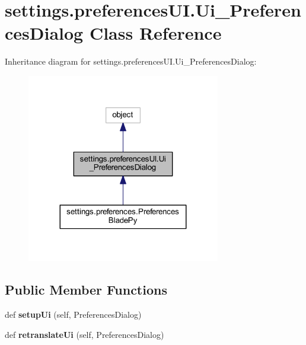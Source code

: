 \hypertarget{a00107}{}\section{settings.\+preferences\+U\+I.\+Ui\+\_\+\+Preferences\+Dialog Class Reference}
\label{a00107}


Inheritance diagram for settings.\+preferences\+U\+I.\+Ui\+\_\+\+Preferences\+Dialog\+:
\nopagebreak
\begin{figure}[H]
\begin{center}
\leavevmode
\includegraphics[width=239pt]{a00106}
\end{center}
\end{figure}
\subsection*{Public Member Functions}
\begin{DoxyCompactItemize}
\item 
\hypertarget{a00107_a61eadae581e6b31932e65f89ee78760c}{}\label{a00107_a61eadae581e6b31932e65f89ee78760c} 
def {\bfseries setup\+Ui} (self, Preferences\+Dialog)
\item 
\hypertarget{a00107_a29096d3ca31a6d880f3e4680987243e8}{}\label{a00107_a29096d3ca31a6d880f3e4680987243e8} 
def {\bfseries retranslate\+Ui} (self, Preferences\+Dialog)
\end{DoxyCompactItemize}
